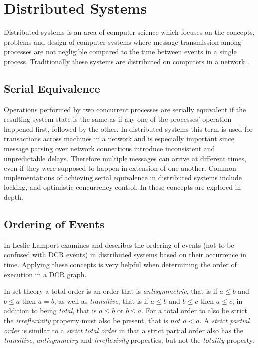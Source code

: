 	\newpar 

	\section{Distributed Systems}
		Distributed systems is an area of computer science which focuses on the concepts, problems and design of computer systems where message transmission among processes are not negligible compared to the time between events in a single process. Traditionally these systems are distributed on computers in a network \cite{Coulouris:2011:DSC:2029110}. 
		
		\subsection{Serial Equivalence}
		Operations performed by two concurrent processes are serially equivalent if the resulting system state is the same as if any one of the processes' operation happened first, followed by the other. In distributed systems this term is used for transactions across machines in a network and is especially important since message parsing over network connections introduce inconsistent and unpredictable delays. Therefore multiple messages can arrive at different times, even if they were supposed to happen in extension of one another. Common implementations of achieving serial equivalence in distributed systems include locking, and optimistic concurrency control. In \cite{Coulouris:2011:DSC:2029110:chapter16} these concepts are explored in depth.
		
		\subsection{Ordering of Events}\label{subsec:orderingofevents}
		In \cite{Lamport:1978:TCO:359545.359563} Leslie Lamport examines and describes the ordering of events (not to be confused with DCR events) in distributed systems based on their occurrence in time. Applying these concepts is very helpful when determining the order of execution in a DCR graph. 
		
		\newpar In set theory a total order is an order that is \textit{antisymmetric}, that is if $a \leq b$ and $b \leq a$ then $a = b$, as well as \textit{transitive}, that is if $a \leq b$ and $b \leq c$ then $a \leq c$, in addition to being \textit{total}, that is $a \leq b$ or $b \leq a$. For a total order to also be strict the \textit{irreflexivity} property must also be present, that is $not$ $a < a$. A \textit{strict partial order} is similar to a \textit{strict total order} in that a strict partial order also has the \textit{transitive}, \textit{antisymmetry} and \textit{irreflexivity} properties, but not the \textit{totality} property.
		

